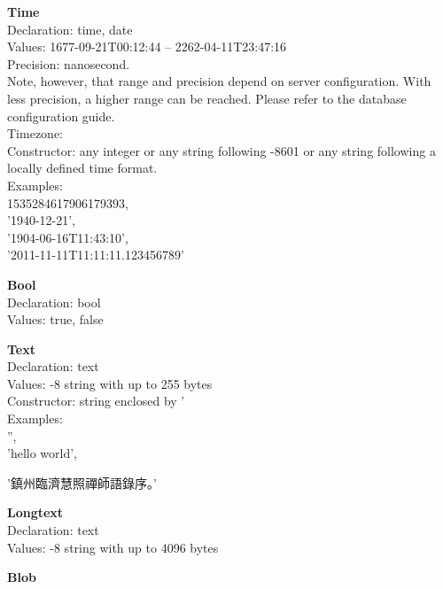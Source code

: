 \begin{minipage}{\textwidth}
\textbf{Time} \\
Declaration: time, date \\
Values:   1677-09-21T00:12:44 --
          2262-04-11T23:47:16 \\
Precision: nanosecond. \\
Note, however, that range and precision depend on server configuration.
With less precision, a higher range can be reached.
Please refer to the database configuration guide. \\
Timezone:  \\
Constructor: any integer or any string following -8601 
or any string following a locally defined time format. \\
Examples:\\
1535284617906179393, \\
'1940-12-21', \\
'1904-06-16T11:43:10', \\
'2011-11-11T11:11:11.123456789'
\end{minipage}

\begin{minipage}{\textwidth}
\textbf{Bool} \\
Declaration: bool \\
Values: true, false
\end{minipage}

\begin{minipage}{\textwidth}
\textbf{Text} \\
Declaration: text \\
Values: -8 string with up to 255 bytes\\
Constructor: string enclosed by ' \\
Examples:\\
'',\\
'hello world',\\
\begin{CJK}{UTF8}{gbsn}
'鎮州臨濟慧照禪師語錄序。'
\end{CJK}
\end{minipage}

\begin{minipage}{\textwidth}
\textbf{Longtext} \\
Declaration: text \\
Values: -8 string with up to 4096 bytes\\
\end{minipage}
\begin{minipage}{\textwidth}
\textbf{Blob} \\
\end{minipage}

